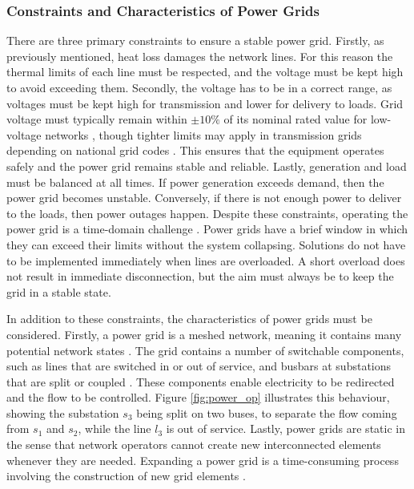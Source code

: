 \subsubsection{Constraints and Characteristics of Power Grids}\label{sssec:const_character_pg}
There are three primary constraints to ensure a stable power grid. Firstly, as previously mentioned, heat loss damages the network lines. For this reason the thermal limits of each line must be respected, and the voltage must be kept high to avoid exceeding them. Secondly, the voltage has to be in a correct range, as voltages must be kept high for transmission and lower for delivery to loads. 
Grid voltage must typically remain within $\pm10\%$ of its nominal rated value for low-voltage networks \cite{en50160}, though tighter limits may apply in transmission grids depending on national grid codes \cite{ansi_c84}. This ensures that the equipment operates safely and the power grid remains stable and reliable.
Lastly, generation and load must be balanced at all times. If power generation exceeds demand, then the power grid becomes unstable. Conversely, if there is not enough power to deliver to the loads, then power outages happen. 
Despite these constraints, operating the power grid is a time-domain challenge \cite{rl4network_operation}. Power grids have a brief window in which they can exceed their limits without the system collapsing. Solutions do not have to be implemented immediately when lines are overloaded. A short overload does not result in immediate disconnection, but the aim must always be to keep the grid in a stable state.

In addition to these constraints, the characteristics of power grids must be considered. Firstly, a power grid is a meshed network, meaning it contains many potential network states \cite{grl4powergrids}. The grid contains a number of switchable components, such as lines that are switched in or out of service, and busbars at substations that are split or coupled \cite{rl4network_operation}. These components enable electricity to be redirected and the flow to be controlled. Figure \ref{fig:power_op} illustrates this behaviour, showing the substation $s_3$ being split on two buses, to separate the flow coming from $s_1$ and $s_2$, while the line $l_3$ is out of service. 
Lastly, power grids are static in the sense that network operators cannot create new interconnected elements whenever they are needed. Expanding a power grid is a time-consuming process involving the construction of new grid elements \cite{rl4network_operation}.

